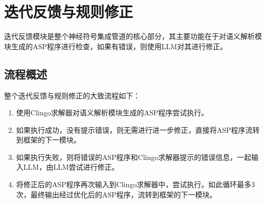 \section{迭代反馈与规则修正}\label{rule-fix}
迭代反馈模块是整个神经符号集成管道的核心部分，其主要功能在于对语义解析模块生成的ASP程序进行检查，如果有错误，则使用LLM对其进行修正。
\subsection{流程概述}
整个迭代反馈与规则修正的大致流程如下：
\begin{enumerate}[itemsep=0pt,parsep=0pt]
\item 使用Clingo求解器对语义解析模块生成的ASP程序尝试执行。
\item 如果执行成功，没有提示错误，则无需进行进一步修正，直接将ASP程序流转到框架的下一模块。
\item 如果执行失败，则将错误的ASP程序和Clingo求解器提示的错误信息，一起输入LLM，由LLM尝试进行修正。
\item 将修正后的ASP程序再次输入到Clingo求解器中，尝试执行。如此循环最多3次，最终输出经过优化后的ASP程序，流转到框架的下一模块。
\end{enumerate}
